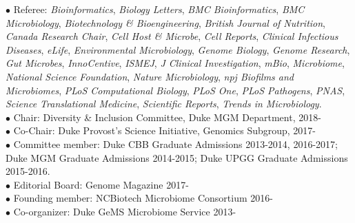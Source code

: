 \documentclass[overlapped,line,11pt]{res}
\begin{document}
\begin{resume}
\hangindent=0.5in $\bullet$\hspace{.1in} Referee:
\emph{Bioinformatics}, \emph{Biology Letters}, \emph{BMC
  Bioinformatics}, \emph{BMC Microbiology}, \emph{Biotechnology \&
  Bioengineering}, \emph{British Journal of Nutrition}, \emph{Canada
  Research Chair}, \emph{Cell Host \& Microbe}, \emph{Cell Reports},
\emph{Clinical Infectious Diseases}, \emph{eLife}, \emph{Environmental
  Microbiology}, \emph{Genome Biology}, \emph{Genome Research},
\emph{Gut Microbes}, \emph{InnoCentive}, \emph{ISMEJ}, \emph{J
  Clinical Investigation}, \emph{mBio}, \emph{Microbiome},
\emph{National Science Foundation}, \emph{Nature Microbiology},
\emph{npj Biofilms and Microbiomes}, \emph{PLoS Computational
  Biology}, \emph{PLoS One}, \emph{PLoS Pathogens}, \emph{PNAS},
\emph{Science Translational Medicine}, \emph{Scientific Reports},
\emph{Trends in Microbiology}. \\

\vspace{-10mm} \hangindent=0.5in $\bullet$\hspace{.1in} Chair:
Diversity \& Inclusion Committee, Duke MGM Department, 2018- \\

\vspace{-10mm} \hangindent=0.5in $\bullet$\hspace{.1in} Co-Chair: Duke
Provost's Science Initiative, Genomics Subgroup, 2017- \\

\vspace{-10mm} \hangindent=0.5in $\bullet$\hspace{.1in} Committee
member: Duke CBB Graduate Admissions 2013-2014, 2016-2017; Duke MGM Graduate
Admissions 2014-2015; Duke UPGG Graduate Admissions 2015-2016. \\

\vspace{-10mm}
\hangindent=0.5in $\bullet$\hspace{.1in} Editorial Board: Genome Magazine
2017- \\

\vspace{-10mm}
\hangindent=0.5in $\bullet$\hspace{.1in} Founding member: NCBiotech
Microbiome Consortium
2016- \\

\vspace{-10mm}
\hangindent=0.5in $\bullet$\hspace{.1in} Co-organizer: Duke GeMS
Microbiome Service 2013- \\


\end{resume}
\end{document}
